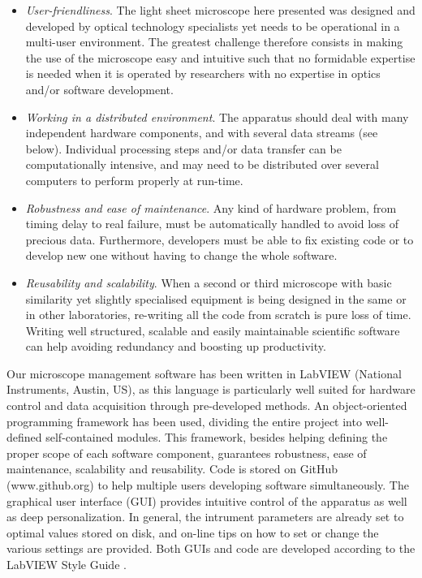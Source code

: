 \documentclass[12pt]{spieman}  %
\begin{document}
\begin{itemize}
\item{\emph{User-friendliness}. The light sheet microscope here presented was designed and developed by optical technology specialists yet needs to be operational in a multi-user environment. The greatest challenge therefore consists in making the use of the microscope easy and intuitive such that no formidable expertise is needed when it is operated by researchers with no expertise in optics and/or software development.}
\item{\emph{Working in a distributed environment}. The apparatus should deal with many independent hardware components, and with several data streams (see below). Individual processing steps and/or data transfer can be computationally intensive, and may need to be distributed over several computers to perform properly at run-time.}
\item{\emph{Robustness and ease of maintenance}. Any kind of hardware problem, from timing delay to real failure, must be automatically handled to avoid loss of precious data. Furthermore, developers must be able to fix existing code or to develop new one without having to change the whole software.}
\item{\emph{Reusability and scalability}. When a second or third microscope with basic similarity yet slightly specialised equipment is being designed in the same or in other laboratories, re-writing all the code from scratch is pure loss of time. Writing well structured, scalable and easily maintainable scientific software can help avoiding redundancy and boosting up productivity.}
\end{itemize}

Our microscope management software has been written in LabVIEW (National Instruments, Austin, US), as this language is particularly well suited for hardware control and data acquisition through pre-developed methods. An object-oriented programming framework \cite{castagna1997object} has been used, dividing the entire project into well-defined self-contained modules. This framework, besides helping defining the proper scope of each software component, guarantees robustness, ease of maintenance, scalability and reusability. Code is stored on GitHub (www.github.org) to help multiple users developing software simultaneously. The graphical user interface (GUI) provides intuitive control of the apparatus as well as deep personalization. In general, the intrument parameters are already set to optimal values stored on disk, and on-line tips on how to set or change the various settings are provided. Both GUIs and code are developed according to the LabVIEW Style Guide \cite{LabviewStyle}.
\end{document}
